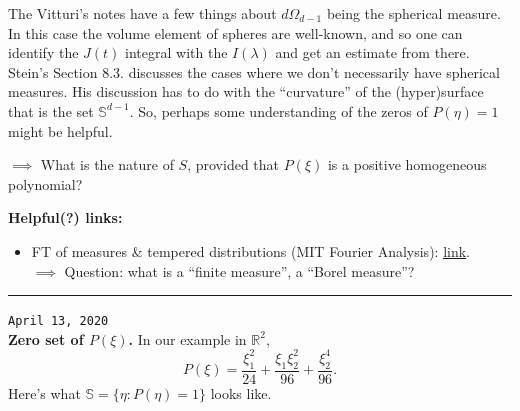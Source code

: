 \documentclass{article}
\theoremstyle{definition}
\newcommand{\f}[2]{\frac{#1}{#2}}
\begin{document}
\begin{itemize}
    
    The Vitturi's notes have a few things about $d\Omega_{d-1}$ being the spherical measure. In this case the volume element of spheres are well-known, and so one can identify the $J(t)$ integral with the $I(\lambda)$ and get an estimate from there.\\
    
    Stein's Section 8.3. discusses the cases where we don't necessarily have spherical measures. His discussion has to do with the ``curvature'' of the (hyper)surface that is the set $\mathbb{S}^{d-1}$. So, perhaps some understanding of the zeros of $P(\eta) = 1$ might be helpful. 
    
    $\implies$ What is the nature of $S$, provided that $P(\xi)$ is a positive homogeneous polynomial? 
\end{itemize}


\textbf{Helpful(?) links:}
\begin{itemize}
    \item FT of measures \& tempered distributions (MIT Fourier Analysis): \href{https://math.mit.edu/~jerison/103/handouts/fourierint2.13.pdf}{\underline{link}}. \\
    
    $\implies $ Question: what is a ``finite measure'', a ``Borel measure''?
\end{itemize}

\hrule

\newpage


\noindent \texttt{April 13, 2020}\\

\noindent \textbf{Zero set of $P(\xi)$.} In our example in $\mathbb{R}^2$, $$P(\xi) = \f{\xi_1^2}{24} + \f{\xi_1 \xi_2^2}{96} + \f{\xi_2^4}{96}.$$ Here's what $\mathbb{S} = \{ \eta : P(\eta) = 1 \}$ looks like. \\
\end{document}
